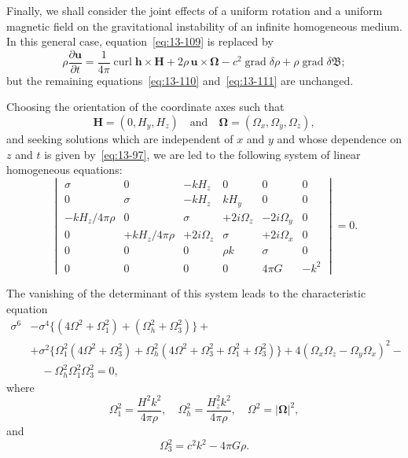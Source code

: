 Finally, we shall consider the joint effects of a uniform rotation and a uniform magnetic field on the gravitational instability of an infinite homogeneous medium. In this general case, equation~\eqref{eq:13-109} is replaced by
\begin{equation}
\label{eq:13-126}
\rho\frac{\partial\mathbf{u}}{\partial t} = \frac{1}{4\pi}\operatorname{curl}\mathbf{h}\times\mathbf{H} + 2\rho\,\mathbf{u}\times\boldsymbol{\Omega} - c^2\operatorname{grad}\delta\rho + \rho\operatorname{grad}\delta\mathfrak{B};
\end{equation}
but the remaining equations~\eqref{eq:13-110} and~\eqref{eq:13-111} are unchanged.

Choosing the orientation of the coordinate axes such that
\begin{equation}
\label{eq:13-127}
\mathbf{H} = (0, H_y, H_z) \quad \text{and} \quad \boldsymbol{\Omega} = (\Omega_x, \Omega_y, \Omega_z),
\end{equation}
and seeking solutions which are independent of $x$ and $y$ and whose dependence on $z$ and $t$ is given by~\eqref{eq:13-97}, we are led to the following system of linear homogeneous equations:
\begin{equation}
\label{eq:13-128}
\begin{vmatrix}
\sigma & 0 & -kH_z & 0 & 0 & 0 \\
0 & \sigma & -kH_z & kH_y & 0 & 0 \\
-kH_z/4\pi\rho & 0 & \sigma & +2i\Omega_z & -2i\Omega_y & 0 \\
0 & +kH_z/4\pi\rho & +2i\Omega_z & \sigma & +2i\Omega_x & 0 \\
0 & 0 & 0 & \rho k & \sigma & 0 \\
0 & 0 & 0 & 0 & 4\pi G & -k^2
\end{vmatrix}
= 0.
\end{equation}

The vanishing of the determinant of this system leads to the characteristic equation
\begin{equation}
\label{eq:13-129}
\begin{split}
\sigma^6 &- \sigma^4\{(4\Omega^2+\Omega_1^2)+(\Omega_h^2+\Omega_3^2)\} + \\
&+ \sigma^2\{\Omega_1^2(4\Omega^2+\Omega_3^2)+\Omega_h^2(4\Omega^2+\Omega_3^2+\Omega_1^2+\Omega_3^2)\} + 4(\Omega_x\Omega_z - \Omega_y\Omega_x)^2 - \\
&\quad -\Omega_h^2\Omega_1^2\Omega_3^2 = 0,
\end{split}
\end{equation}
where
\begin{equation}
\label{eq:13-130}
\Omega_1^2 = \frac{H^2k^2}{4\pi\rho}, \quad \Omega_h^2 = \frac{H_z^2k^2}{4\pi\rho}, \quad \Omega^2 = |\boldsymbol{\Omega}|^2,
\end{equation}
and
\begin{equation*}
\Omega_3^2 = c^2k^2-4\pi G\rho.
\end{equation*}


